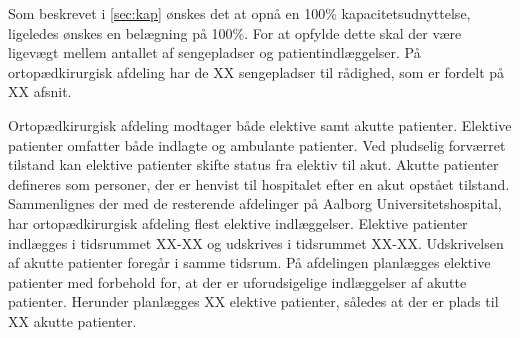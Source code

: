 Som beskrevet i \autoref{sec:kap} ønskes det at opnå en 100\% kapacitetsudnyttelse, ligeledes ønskes en belægning på 100\%. 
For at opfylde dette skal der være ligevægt mellem antallet af sengepladser og patientindlæggelser. På ortopædkirurgisk afdeling har de XX sengepladser til rådighed, som er fordelt på XX afsnit.

Ortopædkirurgisk afdeling modtager både elektive samt akutte patienter. Elektive patienter omfatter både indlagte og ambulante patienter. Ved pludselig forværret tilstand kan elektive patienter skifte status fra elektiv til akut. Akutte patienter defineres som personer, der er henvist til hospitalet efter en akut opstået tilstand. Sammenlignes der med de resterende afdelinger på Aalborg Universitetshospital, har ortopædkirurgisk afdeling flest elektive indlæggelser.\cite{RegionNord2016} Elektive patienter indlægges i tidsrummet XX-XX og udskrives i tidsrummet XX-XX. Udskrivelsen af akutte patienter foregår i samme tidsrum. På afdelingen planlægges elektive patienter med forbehold for, at der er uforudsigelige indlæggelser af akutte patienter. Herunder planlægges XX elektive patienter, således at der er plads til XX akutte patienter.